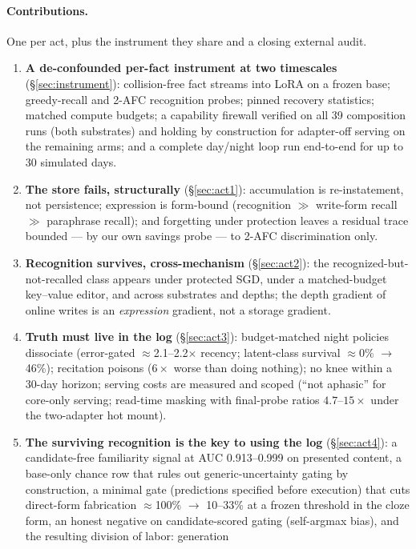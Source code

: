\documentclass[11pt]{article}
\begin{document}
\paragraph{Contributions.} One per act, plus the instrument they share and a closing external audit.
\begin{enumerate}
\item \textbf{A de-confounded per-fact instrument at two timescales} (\S\ref{sec:instrument}):
collision-free fact streams into LoRA on a frozen base; greedy-recall and 2-AFC recognition
probes; pinned recovery statistics; matched compute budgets; a capability firewall verified on
all 39 composition runs (both substrates) and holding by construction for adapter-off serving on
the remaining arms; and a complete day/night loop run end-to-end for up to 30 simulated days.
\item \textbf{The store fails, structurally} (\S\ref{sec:act1}): accumulation is re-instatement,
not persistence; expression is form-bound (recognition $\gg$ write-form recall $\gg$ paraphrase
recall); and forgetting under protection leaves a residual trace bounded --- by our own savings
probe --- to 2-AFC discrimination only.
\item \textbf{Recognition survives, cross-mechanism} (\S\ref{sec:act2}): the
recognized-but-not-recalled class appears under protected SGD, under a matched-budget key--value
editor, and across substrates and depths; the depth gradient of online writes is an
\emph{expression} gradient, not a storage gradient.
\item \textbf{Truth must live in the log} (\S\ref{sec:act3}): budget-matched night policies
dissociate (error-gated $\approx$2.1--2.2$\times$ recency; latent-class survival $\approx$0\% $\to$ 46\%); recitation
poisons ($6\times$ worse than doing nothing); no knee within a 30-day horizon; serving costs are
measured and scoped (``not aphasic'' for core-only serving; read-time masking with final-probe
ratios $4.7$--$15\times$ under the two-adapter hot mount).
\item \textbf{The surviving recognition is the key to using the log} (\S\ref{sec:act4}): a
candidate-free familiarity signal at AUC 0.913--0.999 on presented content, a base-only chance
row that rules out generic-uncertainty gating by construction, a minimal gate (predictions specified before execution) that
cuts direct-form fabrication $\approx$100\% $\to$ 10--33\% at a frozen threshold in the cloze
form, an honest negative on
candidate-scored gating (self-argmax bias), and the resulting division of labor: generation

\end{enumerate}
\end{document}
